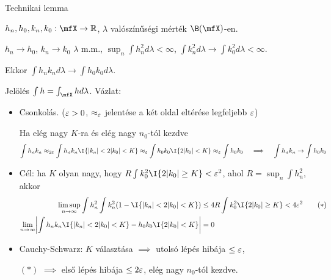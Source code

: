 \documentclass[aspectratio=169,notheorems,9pt,\option]{beamer}
\begin{document}
\begin{frame}{Technikai lemma}
  \begin{lemma}
    $h_n,h_0,k_n,k_0:\mfX\to\real$, $\lambda$ valószínűségi mérték $\B(\mfX)$-en.

    $h_n\to h_0$, $k_n\to k_0$ $\lambda$ m.m., 
    $\sup_n \int h_n^2d\lambda<\infty$, 
    $\int k_n^2d\lambda\to\int k_0^2d\lambda<\infty$.
    
    Ekkor $\int h_nk_nd\lambda\to\int h_0k_0d\lambda$.
  \end{lemma}
  Jelölés $\int h=\int_{\mfX} h d\lambda$. Vázlat:
  \begin{itemize}
    \item Csonkolás. ($\varepsilon>0$, $\approx_\varepsilon$ jelentése a két oldal eltérése legfeljebb $\varepsilon$) 
    
    Ha elég nagy $K$-ra és elég nagy $n_0$-tól kezdve
    \begin{displaymath}
      \int h_n k_n
      \approx_{2\eps}
      \int h_n k_n\I{\abs{k_n}<2\abs{k_0}<K}
      \approx_{\eps} 
      \int h_0 k_0\I{2\abs{k_0}<K}
      \approx_\eps 
      \int h_0k_0
      \quad\implies\quad \int h_n k_n\to\int h_0k_0
    \end{displaymath}
    \item Cél: ha $K$ olyan nagy, hogy $R\int k_0^2\I{2\abs{k_0}\geq K}<\eps^2$, ahol $R=\sup_n\int h_n^2$, akkor 
    \begin{align*}
      \limsup_{n\to\infty} \int h_n^2\int k^2_n(1-\I{\abs{k_n}<2\abs{k_0}<K}) &\leq 4R\int k_0^2\I{2\abs{k_0}\geq K}<4\eps^2 \tag{$*$}\\
      \lim_{n\to\infty} \abs*{\int h_n k_n\I{\abs{k_n}<2\abs{k_0}<K}-h_0 k_0\I{2\abs{k_0}<K}}&=0
    \end{align*}
    \item Cauchy-Schwarz: $K$ választása $\implies$ utolsó lépés hibája $\leq\varepsilon$,

    \hphantom{Cauchy-Schwarz: }$(*)$ $\implies$ első lépés hibája $\leq 2\varepsilon$,  elég nagy $n_0$-tól kezdve.
  \end{itemize}
\end{frame}
\end{document}
